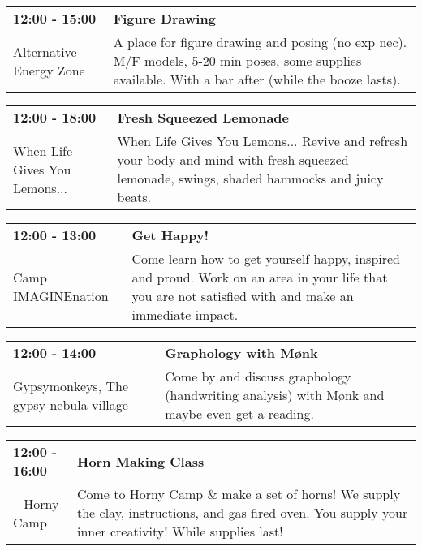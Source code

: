 \begin{tabular}{ p{1in} p{2.2in} }
    \textbf{12:00 - 15:00} & \textbf{Figure Drawing} \\
    Alternative Energy Zone \newline  & A place for figure drawing and posing (no exp nec).  M/F models, 5-20 min poses, some supplies available. With a bar after (while the booze lasts). \\
    \hline 
\end{tabular}
    
\begin{tabular}{ p{1in} p{2.2in} }
    \textbf{12:00 - 18:00} & \textbf{Fresh Squeezed Lemonade} \\
    When Life Gives You Lemons... \newline  & When Life Gives You Lemons... Revive and refresh your body and mind with fresh squeezed lemonade, swings, shaded hammocks and juicy beats. \\
    \hline 
\end{tabular}
    
\begin{tabular}{ p{1in} p{2.2in} }
    \textbf{12:00 - 13:00} & \textbf{Get Happy!} \\
    Camp IMAGINEnation \newline  & Come learn how to get yourself happy, inspired and proud. Work on an area in your life that you are not satisfied with and make an immediate impact. \\
    \hline 
\end{tabular}
    
\begin{tabular}{ p{1in} p{2.2in} }
    \textbf{12:00 - 14:00} & \textbf{Graphology with M\o nk} \\
    Gypsymonkeys, The \newline gypsy nebula village & Come by and discuss graphology (handwriting analysis) with M\o nk and maybe even get a reading. \\
    \hline 
\end{tabular}
    
\begin{tabular}{ p{1in} p{2.2in} }
    \textbf{12:00 - 16:00} & \textbf{Horn Making Class} \\
    ~ \newline Horny Camp & Come to Horny Camp \& make a set of horns! We supply the clay, instructions, and gas fired oven. You supply your inner creativity! While supplies last! \\
    \hline 
\end{tabular}
    
